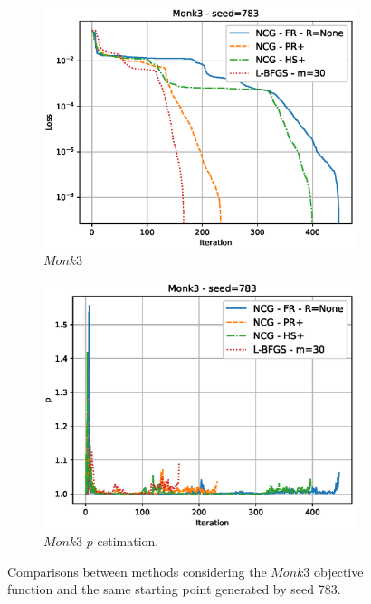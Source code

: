 \documentclass[11pt]{article}
\begin{document}
\begin{figure}[H]
\centering
\begin{subfigure}{.5\textwidth}
  \centering
  \includegraphics[width=1.1\linewidth]{Images/m3-783_comp.eps}
  \caption{$Monk3$}
  \label{fig:sub5}
\end{subfigure}%
\begin{subfigure}{.5\textwidth}
  \centering
  \includegraphics[width=1.1\linewidth]{Images/m3-783_comp_p.eps}
  \caption{$Monk3$ $p$ estimation.}
  \label{fig:sub6}
\end{subfigure}
\caption{Comparisons between methods considering the $Monk3$  objective function and the same starting point generated by seed 783.}\label{fig:test3}
\end{figure}
\end{document}
